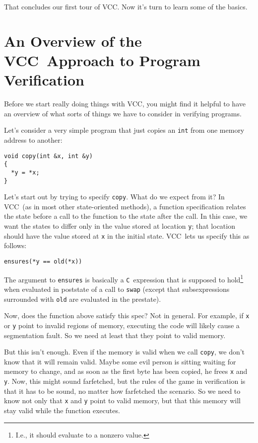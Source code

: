 \documentclass{report}
\newcommand{\Q}[1]{\lstinline~#1~}
\newcommand{\C}{\Q{C}}
\newcommand{\VCC}{VCC}
\newcommand{\Todo}[1]{\marginpar{#1}}
\begin{document}
\Todo{Demo the inspector}
That concludes our first tour of \VCC. Now it's turn to learn some of
the basics.

\chapter{An Overview of the \VCC\ Approach to Program Verification}
Before we start really doing things with \VCC, you might find it
helpful to have an overview of what sorts of things we have to
consider in verifying programs.


Let's consider a very simple program that just copies an \Q{int} from
one memory address to another:
\begin{lstlisting}
void copy(int &x, int &y)
{
  *y = *x;
}
\end{lstlisting}

Let's start out by trying to specify \Q{copy}. What do we expect
from it? In \VCC\ (as in most other state-oriented methods), a
function specification relates the state before a call to the function
to the state after the call. In this case, we want the states to
differ only in the value stored at location \Q{y}; that location
should have the value stored at \Q{x} in the initial state.
\VCC\ lets us specify this as follows:
\begin{lstlisting}
ensures(*y == old(*x))
\end{lstlisting}
The argument to \Q{ensures} is basically a \C\ expression that is
supposed to hold\footnote{I.e., it should evaluate to a nonzero
  value.} when evaluated in poststate of a call to \Q{swap} (except
that subsexpressions surrounded with \Q{old} are evaluated in the
prestate).

Now, does the function above satisfy this spec? Not in general.
For example, if \Q{x} or \Q{y} point to invalid regions of
memory, executing the code will likely cause a segmentation fault. 
So we need at least that they point to valid memory.

But this isn't enough. Even if the memory is valid when we call
\Q{copy}, we don't know that it will remain valid. Maybe some evil
person is sitting waiting for memory to change, and as soon as the
first byte has been copied, he frees \Q{x} and \Q{y}. Now, this might
sound farfetched, but the rules of the game in verification is that
it has to be sound, no matter how farfetched the scenario.
So we need to know not only that \Q{x} and \Q{y} point to valid
memory, but that this memory will stay valid while the function
executes. 
\end{document}
